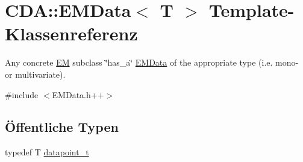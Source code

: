 \hypertarget{classCDA_1_1EMData}{
\section{CDA::EMData$<$ T $>$ Template-\/Klassenreferenz}
\label{classCDA_1_1EMData}
}


Any concrete \hyperlink{classCDA_1_1EM}{EM} subclass \char`\"{}has\_\-a\char`\"{} \hyperlink{classCDA_1_1EMData}{EMData} of the appropriate type (i.e. mono-\/ or multivariate).  




{\ttfamily \#include $<$EMData.h++$>$}

\subsection*{Öffentliche Typen}
\begin{DoxyCompactItemize}
\item 
typedef T \hyperlink{classCDA_1_1EMData_a320dfbd3ad13091a99602a140688a05d}{datapoint\_\-t}
\end{DoxyCompactItemize}
